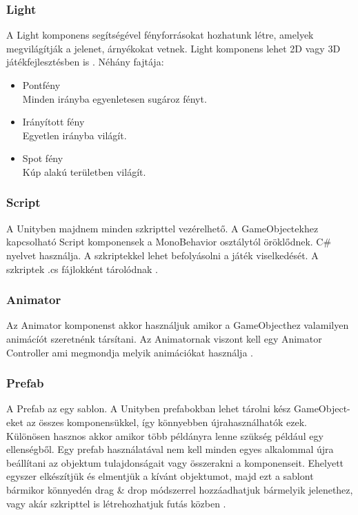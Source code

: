 \documentclass[
]{thesis-ekf}
\theoremstyle{definition}
\theoremstyle{remark}
\begin{document}
\subsubsection{Light}
A Light komponens segítségével fényforrásokat hozhatunk létre, amelyek megvilágítják a jelenet, árnyékokat vetnek. Light komponens lehet 2D vagy 3D játékfejlesztésben is \cite{UnityLight}. Néhány fajtája:
\begin{itemize}
	\item Pontfény \\ Minden irányba egyenletesen sugároz fényt.
	\item Irányított fény \\ Egyetlen irányba világít.
	\item Spot fény \\ Kúp alakú területben világít.
\end{itemize}
\subsubsection{Script}
A Unityben majdnem minden szkripttel vezérelhető. A GameObjectekhez kapcsolható Script komponensek a MonoBehavior osztálytól öröklődnek. C\# nyelvet használja. A szkriptekkel lehet befolyásolni a játék viselkedését. A szkriptek .cs fájlokként tárolódnak \cite{UnityScript}.

\subsubsection{Animator}
Az Animator komponenst akkor használjuk amikor a GameObjecthez valamilyen animácíót szeretnénk társítani. Az Animatornak viszont kell egy Animator Controller ami megmondja melyik animációkat használja \cite{UnityAnimatorComponent}.

\subsubsection{Prefab}
A Prefab az egy sablon. A Unityben prefabokban lehet tárolni kész GameObject-eket az összes komponensükkel, így könnyebben újrahasználhatók ezek. Különösen hasznos akkor amikor több példányra lenne szükség például egy ellenségből. Egy prefab használatával nem kell minden egyes alkalommal újra beállítani az objektum tulajdonságait vagy összerakni a komponenseit. Ehelyett egyszer elkészítjük és elmentjük a kívánt objektumot, majd ezt a sablont bármikor könnyedén drag \& drop módszerrel hozzáadhatjuk bármelyik jelenethez, vagy akár szkripttel is létrehozhatjuk futás közben \cite{UnityPrefabs}.
\end{document}

